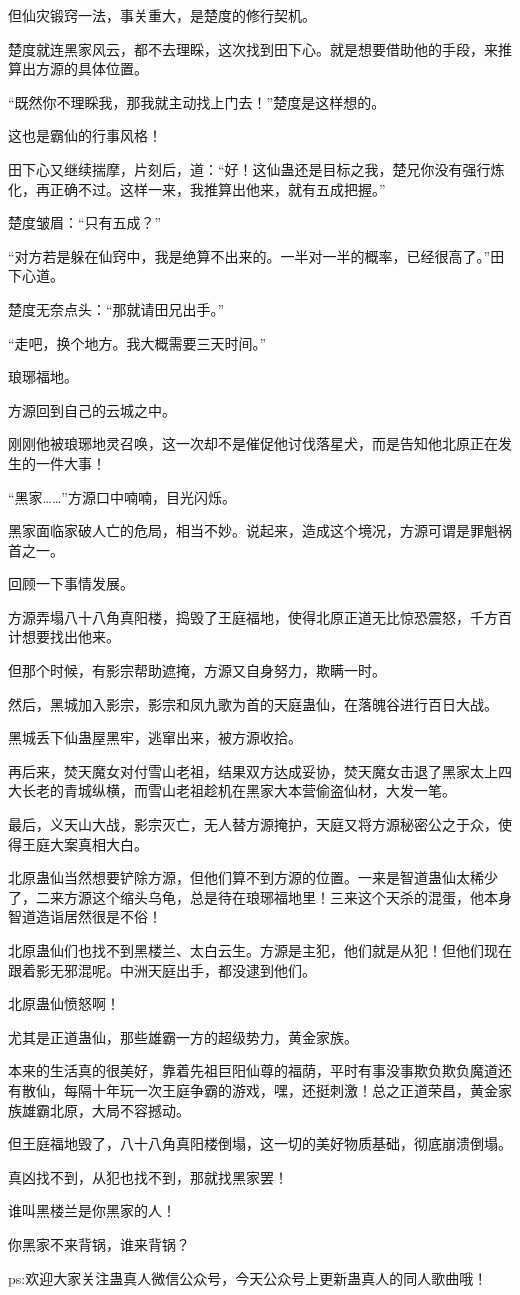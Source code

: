 \begin{this_body}
但仙灾锻窍一法，事关重大，是楚度的修行契机。

楚度就连黑家风云，都不去理睬，这次找到田下心。就是想要借助他的手段，来推算出方源的具体位置。

“既然你不理睬我，那我就主动找上门去！”楚度是这样想的。

这也是霸仙的行事风格！

田下心又继续揣摩，片刻后，道：“好！这仙蛊还是目标之我，楚兄你没有强行炼化，再正确不过。这样一来，我推算出他来，就有五成把握。”

楚度皱眉：“只有五成？”

“对方若是躲在仙窍中，我是绝算不出来的。一半对一半的概率，已经很高了。”田下心道。

楚度无奈点头：“那就请田兄出手。”

“走吧，换个地方。我大概需要三天时间。”

琅琊福地。

方源回到自己的云城之中。

刚刚他被琅琊地灵召唤，这一次却不是催促他讨伐落星犬，而是告知他北原正在发生的一件大事！

“黑家……”方源口中喃喃，目光闪烁。

黑家面临家破人亡的危局，相当不妙。说起来，造成这个境况，方源可谓是罪魁祸首之一。

回顾一下事情发展。

方源弄塌八十八角真阳楼，捣毁了王庭福地，使得北原正道无比惊恐震怒，千方百计想要找出他来。

但那个时候，有影宗帮助遮掩，方源又自身努力，欺瞒一时。

然后，黑城加入影宗，影宗和凤九歌为首的天庭蛊仙，在落魄谷进行百日大战。

黑城丢下仙蛊屋黑牢，逃窜出来，被方源收拾。

再后来，焚天魔女对付雪山老祖，结果双方达成妥协，焚天魔女击退了黑家太上四大长老的青城纵横，而雪山老祖趁机在黑家大本营偷盗仙材，大发一笔。

最后，义天山大战，影宗灭亡，无人替方源掩护，天庭又将方源秘密公之于众，使得王庭大案真相大白。

北原蛊仙当然想要铲除方源，但他们算不到方源的位置。一来是智道蛊仙太稀少了，二来方源这个缩头乌龟，总是待在琅琊福地里！三来这个天杀的混蛋，他本身智道造诣居然很是不俗！

北原蛊仙们也找不到黑楼兰、太白云生。方源是主犯，他们就是从犯！但他们现在跟着影无邪混呢。中洲天庭出手，都没逮到他们。

北原蛊仙愤怒啊！

尤其是正道蛊仙，那些雄霸一方的超级势力，黄金家族。

本来的生活真的很美好，靠着先祖巨阳仙尊的福荫，平时有事没事欺负欺负魔道还有散仙，每隔十年玩一次王庭争霸的游戏，嘿，还挺刺激！总之正道荣昌，黄金家族雄霸北原，大局不容撼动。

但王庭福地毁了，八十八角真阳楼倒塌，这一切的美好物质基础，彻底崩溃倒塌。

真凶找不到，从犯也找不到，那就找黑家罢！

谁叫黑楼兰是你黑家的人！

你黑家不来背锅，谁来背锅？

ps:欢迎大家关注蛊真人微信公众号，今天公众号上更新蛊真人的同人歌曲哦！

\end{this_body}

